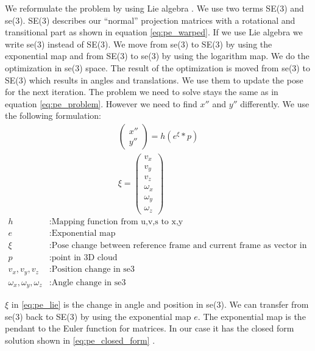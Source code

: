 \documentclass[11pt,a4paper,titlepage,oneside]{report}
\begin{document}
We reformulate the problem by using Lie algebra \cite{se3_explain}. We use two terms SE(3) and se(3). SE(3) describes our ``normal'' projection matrices with a rotational and transitional part as shown in equation \ref{eq:pe_warped}. If we use Lie algebra we write se(3) instead of SE(3). We move from se(3) to SE(3) by using the exponential map and from SE(3) to se(3) by using the logarithm map. We do the optimization in se(3) space. The result of the optimization is moved from se(3) to SE(3) which results in angles and translations. We use them to update the pose for the next iteration. The problem we need to solve stays the same as in equation \ref{eq:pe_problem}. However we need to find $x''$ and $y''$ differently. We use the following formulation:
\begin{equation}\label{eq:pe_lie}
  \begin{gathered}
    \begin{pmatrix}
      x''\\
      y''
    \end{pmatrix}
    =h(e^{\xi}*p)\\
    \xi=\begin{pmatrix}
      v_x\\
      v_y\\
      v_z\\
      \omega_x\\
      \omega_y\\
      \omega_z
    \end{pmatrix}
  \end{gathered}
\end{equation}
\begin{align*}
  h														&: \text{Mapping function from u,v,s to x,y}\\
  e      											&: \text{Exponential map}\\
  \xi    											&: \text{Pose change between reference frame and current frame as vector in SE(3)}\\
  p      											&: \text{point in 3D cloud}\\
	v_x,v_y,v_z									&: \text{Position change in se3}\\
	\omega_x,\omega_y,\omega_z	&: \text{Angle change in se3}
\end{align*}

$\xi$ in \ref{eq:pe_lie} is the change in angle and position in se(3). We can transfer from se(3) back to SE(3) by using the exponential map $e$. The exponential map is the pendant to the Euler function for matrices. In our case it has the closed form solution shown in \ref{eq:pe_closed_form} \cite{rvc}.
\end{document}
